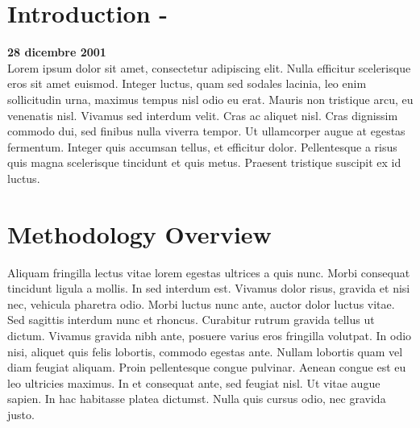\documentclass[
10pt, %
a4paper, %
twocolumn, %
landscape %
]{article}
\begin{document}


\thispagestyle{plain} %


\noindent
\section*{Introduction - } %
{\bfseries 28 dicembre 2001 }\\[6pt]
Lorem ipsum dolor sit amet, consectetur adipiscing elit. Nulla efficitur scelerisque eros sit amet euismod. Integer luctus, quam sed sodales lacinia, leo enim sollicitudin urna, maximus tempus nisl odio eu erat. Mauris non tristique arcu, eu venenatis nisl. Vivamus sed interdum velit. Cras ac aliquet nisl. Cras dignissim commodo dui, sed finibus nulla viverra tempor. Ut ullamcorper augue at egestas fermentum. Integer quis accumsan tellus, et efficitur dolor. Pellentesque a risus quis magna scelerisque tincidunt et quis metus. Praesent tristique suscipit ex id luctus.


\section{Methodology Overview} %
\date{03081888}
Aliquam fringilla lectus vitae lorem egestas ultrices a quis nunc. Morbi consequat tincidunt ligula a mollis. In sed interdum est. Vivamus dolor risus, gravida et nisi nec, vehicula pharetra odio. Morbi luctus nunc ante, auctor dolor luctus vitae. Sed sagittis interdum nunc et rhoncus. Curabitur rutrum gravida tellus ut dictum. Vivamus gravida nibh ante, posuere varius eros fringilla volutpat. In odio nisi, aliquet quis felis lobortis, commodo egestas ante. Nullam lobortis quam vel diam feugiat aliquam. Proin pellentesque congue pulvinar. Aenean congue est eu leo ultricies maximus. In et consequat ante, sed feugiat nisl. Ut vitae augue sapien. In hac habitasse platea dictumst. Nulla quis cursus odio, nec gravida justo.
\end{document}
